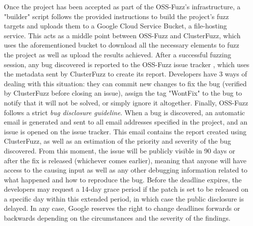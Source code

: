 \newpage
Once the project has been accepted as part of the OSS-Fuzz's infrastructure, a "builder" script follows the provided instructions to build the project's fuzz targets and uploads them to a Google Cloud Service Bucket, a file-hosting service.
\newline
This acts as a middle point between OSS-Fuzz and ClusterFuzz, which uses the aforementioned bucket to download all the necessary elements to fuzz the project as well as upload the results achieved.
\newline \newline \newline
After a successful fuzzing session, any bug discovered is reported to the OSS-Fuzz issue tracker \cite{ossfuzz_bugtracker}, which uses the metadata sent by ClusterFuzz to create its report. 
\newline
Developers have 3 ways of dealing with this situation: they can commit new changes to fix the bug (verified by ClusterFuzz before closing an issue), assign the tag "WontFix" to the bug to notify that it will not be solved, or simply ignore it altogether. 
\newline \newline \newline
Finally, OSS-Fuzz follows a strict \textit{bug disclosure guideline}. \cite{bug_disclosure}
\newline \newline
When a bug is discovered, an automatic email is generated and sent to all email addresses specified in the project, and an issue is opened on the issue tracker.
\newline
This email contains the report created using ClusterFuzz, as well as an estimation of the priority and severity of the bug discovered.
\newline \newline
From this moment, the issue will be publicly visible in 90 days or after the fix is released (whichever comes earlier), meaning that anyone will have access to the causing input as well as any other debugging information related to what happened and how to reproduce the bug.
\newline
Before the deadline expires, the developers may request a 14-day grace period if the patch is set to be released on a specific day within this extended period, in which case the public disclosure is delayed.
\newline \newline
In any case, Google reserves the right to change deadlines forwards or backwards depending on the circumstances and the severity of the findings.


